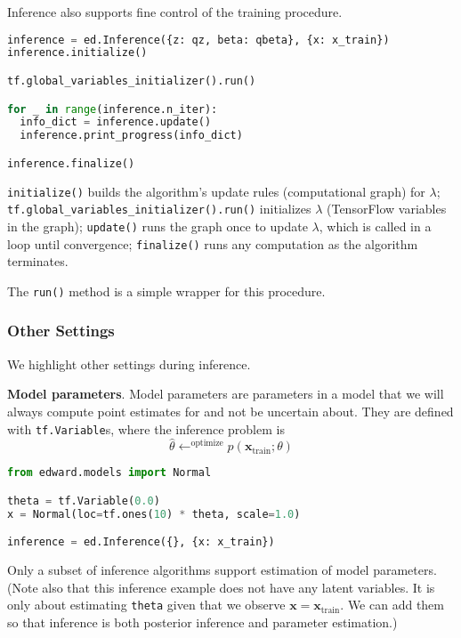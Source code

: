 Inference also supports fine control of the training procedure.

\begin{lstlisting}[language=Python]
inference = ed.Inference({z: qz, beta: qbeta}, {x: x_train})
inference.initialize()

tf.global_variables_initializer().run()

for _ in range(inference.n_iter):
  info_dict = inference.update()
  inference.print_progress(info_dict)

inference.finalize()
\end{lstlisting}

\texttt{initialize()} builds the algorithm's update rules
(computational graph) for $\lambda$;
\texttt{tf.global_variables_initializer().run()} initializes $\lambda$
(TensorFlow variables in the graph);
\texttt{update()} runs the graph once to update
$\lambda$, which is called in a loop until convergence;
\texttt{finalize()} runs any computation as the algorithm
terminates.

The \texttt{run()} method is a simple wrapper for this procedure.

\subsubsection{Other Settings}

We highlight other settings during inference.

\textbf{Model parameters}.
Model parameters are parameters in a model that we will always compute
point estimates for and not be uncertain about.
They are defined with \texttt{tf.Variable}s, where the inference
problem is
\begin{equation*}
\hat{\theta} \leftarrow^{\text{optimize}}
p(\mathbf{x}_{\text{train}}; \theta)
\end{equation*}

\begin{lstlisting}[language=Python]
from edward.models import Normal

theta = tf.Variable(0.0)
x = Normal(loc=tf.ones(10) * theta, scale=1.0)

inference = ed.Inference({}, {x: x_train})
\end{lstlisting}

Only a subset of inference algorithms support estimation of model
parameters.
(Note also that this inference example does not have any latent
variables. It is only about estimating \texttt{theta} given that we
observe $\mathbf{x} = \mathbf{x}_{\text{train}}$. We can add them so
that inference is both posterior inference and parameter estimation.)


